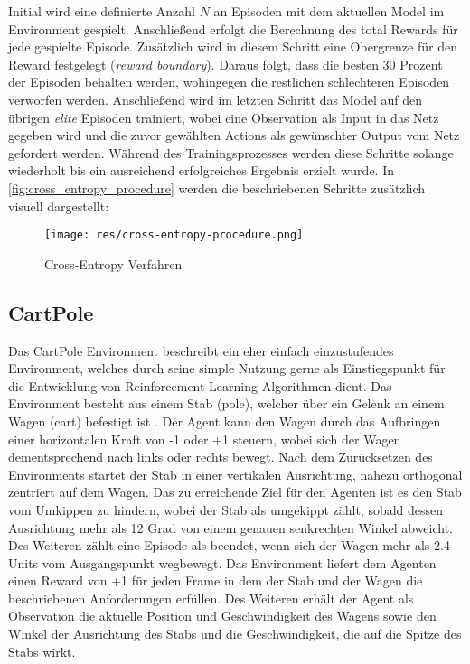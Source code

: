 \documentclass[11pt]{scrartcl}
\begin{document}
Initial wird eine definierte Anzahl $N$ an Episoden mit dem aktuellen Model im Environment gespielt. Anschließend erfolgt die Berechnung des total Rewards für jede gespielte Episode. Zusätzlich wird in 
diesem Schritt eine Obergrenze für den Reward festgelegt 
(\textit{reward boundary}). Daraus folgt, dass die besten 30 Prozent der Episoden behalten werden,
wohingegen die restlichen schlechteren Episoden verworfen werden. Anschließend wird im letzten Schritt
das Model auf den übrigen \textit{elite} Episoden trainiert, wobei eine Observation als Input in das
Netz gegeben wird und die zuvor gewählten Actions als gewünschter Output vom Netz gefordert werden.
Während des Trainingsprozesses werden diese Schritte solange wiederholt bis ein ausreichend
erfolgreiches Ergebnis erzielt wurde. In \autoref{fig:cross_entropy_procedure} werden die
beschriebenen Schritte zusätzlich visuell dargestellt:

\begin{figure}[htp]
\centering
\texttt{[image: res/cross-entropy-procedure.png]}
\caption{Cross-Entropy Verfahren}
\label{fig:cross_entropy_procedure}
\end{figure}

\subsection{CartPole}
Das CartPole Environment beschreibt ein eher einfach einzustufendes Environment, welches durch seine
simple Nutzung gerne als Einstiegspunkt für die Entwicklung von Reinforcement Learning Algorithmen 
dient. Das Environment besteht aus einem Stab (pole), welcher über ein Gelenk an einem Wagen (cart) 
befestigt ist \cite{OAI2016_2}. Der Agent kann den Wagen durch das Aufbringen einer horizontalen Kraft 
von -1 oder +1 steuern, wobei sich der Wagen dementsprechend nach links oder rechts bewegt. Nach 
dem Zurücksetzen des Environments startet der Stab in einer vertikalen Ausrichtung, nahezu orthogonal
zentriert auf dem Wagen. Das zu erreichende Ziel für den Agenten ist es den Stab vom Umkippen zu hindern,
wobei der Stab als umgekippt zählt, sobald dessen Ausrichtung mehr als 12 Grad von einem genauen
senkrechten Winkel abweicht. Des Weiteren zählt eine Episode als beendet, wenn sich der Wagen mehr
als 2.4 Units vom Ausgangspunkt wegbewegt. Das Environment liefert dem Agenten einen Reward von +1
für jeden Frame in dem der Stab und der Wagen die beschriebenen Anforderungen erfüllen. Des Weiteren
erhält der Agent als Observation die aktuelle Position und Geschwindigkeit des Wagens sowie den Winkel
der Ausrichtung des Stabs und die Geschwindigkeit, die auf die Spitze des Stabs wirkt.
\end{document}
